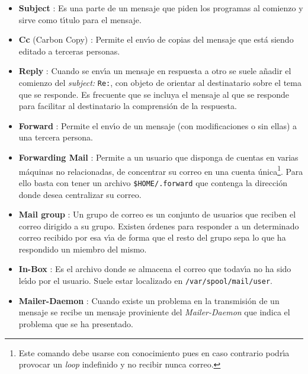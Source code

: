 \begin{itemize}
  
\item {\bf Subject} : Es una parte de un mensaje que piden los
  programas al comienzo y sirve como t{\'\i}tulo para el mensaje.
    
\item {\bf Cc} (Carbon Copy) : Permite el env{\'\i}o de copias del mensaje
  que est{\'a} siendo editado a terceras personas.
    
\item {\bf Reply} : Cuando se env{\'\i}a un mensaje en respuesta a otro se
  suele a{\~n}adir el comienzo del {\it subject:} \verb+Re:+, con objeto
  de orientar al destinatario sobre el tema que se responde. Es
  frecuente que se incluya el mensaje al que se responde para
  facilitar al destinatario la comprensi{\'o}n de la respuesta.
  
\item {\bf Forward} : Permite el env{\'\i}o de un mensaje (con
  modificaciones o sin ellas) a una tercera persona.
  
\item {\bf Forwarding Mail} : Permite a un usuario que disponga de
  cuentas en varias m{\'a}quinas no relacionadas, de concentrar su correo
  en una cuenta {\'u}nica\footnote{Este comando debe usarse con
    conocimiento pues en caso contrario podr{\'\i}a provocar un {\it loop}
    indefinido y no recibir nunca correo.  }. Para ello basta con
  tener un archivo {\tt \$HOME/.forward} que contenga la direcci{\'o}n
  donde desea centralizar su correo.
  
\item {\bf Mail group} : Un grupo de correo es un conjunto de usuarios
  que reciben el correo dirigido a su grupo. Existen {\'o}rdenes para
  responder a un determinado correo recibido por esa v{\'\i}a de forma que
  el resto del grupo sepa lo que ha respondido un miembro del mismo.
  
\item {\bf In-Box} : Es el archivo donde se almacena el correo que
  todav{\'\i}a no ha sido le{\'\i}do por el usuario. Suele estar localizado en
  \verb+/var/spool/mail/user+.
  
\item {\bf Mailer-Daemon} : Cuando existe un problema en la
  transmisi{\'o}n de un mensaje se recibe un mensaje proviniente del {\it
    Mailer-Daemon} que indica el problema que se ha presentado.

\end{itemize}


